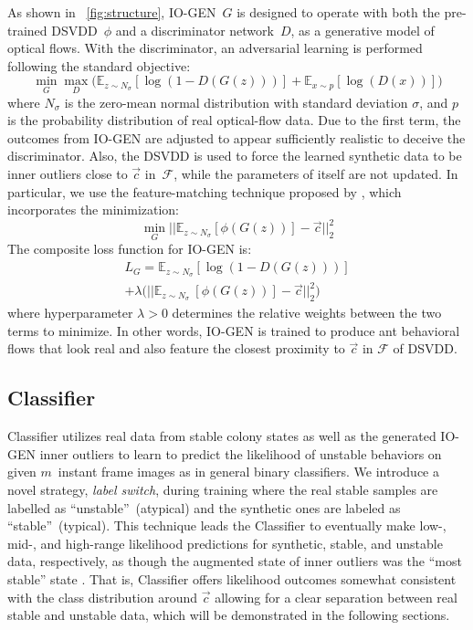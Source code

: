 \documentclass[letterpaper]{article} %
\let\orgautoref\autoref
\renewcommand{\autoref}
{\def\equationautorefname{Equation}%
	\def\figureautorefname{Fig.}%
	\def\subfigureautorefname{Fig.}%
	\def\Itemautorefname{item}%
	\def\tableautorefname{Table}%
	\def\exerciseautorefname{Exercise}%
	\def\starexerciseautorefname{Exercise}%
	\def\sectionautorefname{Section}%
	\def\subsectionautorefname{Section}%
	\def\subsubsectionautorefname{Section}%
	\def\chapterautorefname{Section}%
	\def\partautorefname{Part}%
	\orgautoref}
\begin{document}
As shown in~\autoref{fig:structure}, \mbox{IO-GEN}~$G$ is designed to operate
with both the pre-trained DSVDD~$\phi$ and a discriminator network~$D$,
as a generative model of optical flows. With the discriminator, an
adversarial learning is performed following the standard objective:
\begin{equation*}
    \label{eq:obj1}
    \min_{G} \max_{D}
    \Big( \mathbb{E}_{z \sim \mathit{N_{\sigma}}} [\log(1 - D(G(z)))]
    + \mathbb{E}_{x \sim p} [\log(D(x))] \Big)
\end{equation*}
where $\mathit{N_{\sigma}}$ is the zero-mean normal distribution with
standard deviation $\sigma$, and $p$ is the probability distribution of
real optical-flow data. Due to the first term, the outcomes from
\mbox{IO-GEN} are adjusted to appear sufficiently realistic to deceive the
discriminator. Also, the DSVDD is used to force the learned synthetic
data to be inner outliers close to $\vec{c}$ in~$\mathcal{F}$, while the
parameters of itself are not updated. In particular, we use the
feature-matching technique proposed by \citet{SGZCRC16}, which
incorporates the minimization:
\begin{equation*}
	\label{eq:obj2}
	\min_{G}
	|| \mathbb{E}_{z \sim \mathit{N_{\sigma}}} [\phi(G(z))]
	- \vec{c} ||^{2}_{2}
\end{equation*}
The composite loss function for \mbox{IO-GEN} is:
\begin{multline*}
\label{eq:loss}
	\mathit{L}_{G} =
	\mathbb{E}_{z \sim \mathit{N_{\sigma}}} [\log(1 - D(G(z)))] \\
	+ \lambda \Big( || \mathbb{E}_{z \sim \mathit{N_{\sigma}}} \
	[\phi(G(z))] - \vec{c} ||^{2}_{2} \Big)
\end{multline*}
where hyperparameter $\lambda > 0$ determines the relative
weights between the two terms to minimize. In other words, \mbox{IO-GEN} is
trained to produce ant behavioral flows that look real and
also feature the closest proximity to $\vec{c}$ in $\mathcal{F}$ of
DSVDD.

\subsection{Classifier}
\label{sec:classifier}

Classifier utilizes real data from stable colony states as well as the
generated \mbox{IO-GEN} inner outliers to learn to predict the likelihood of
unstable behaviors on given $m$~instant frame images as in general
binary classifiers. We introduce a novel strategy, \emph{label switch}, during
training where the real stable samples are labelled as
``unstable''~(atypical) and the synthetic ones are labeled as
``stable''~(typical). This technique leads the Classifier to eventually
make \mbox{low-,} \mbox{mid-,} and high-range likelihood predictions for synthetic,
stable, and unstable data, respectively, as though the augmented state
of inner outliers was the ``most stable'' state . That is, Classifier
offers likelihood outcomes somewhat consistent with the class
distribution around $\vec{c}$ allowing for a clear separation between
real stable and unstable data, which will be demonstrated in
the following sections.
\end{document}
